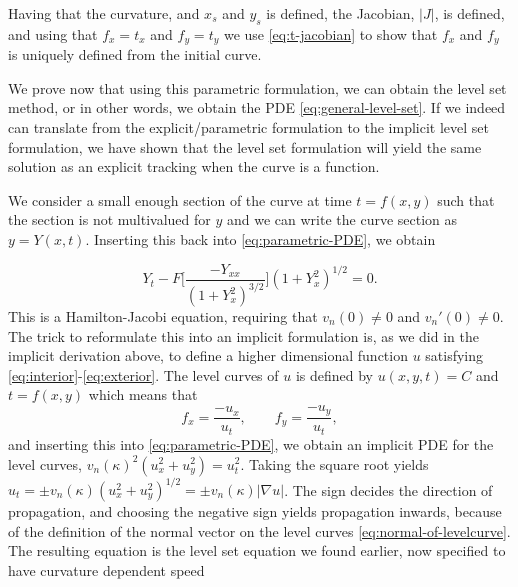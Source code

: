 Having that the curvature, and $x_s$ and $y_s$ is defined, the Jacobian, $|J|$, is defined, and using that $f_x = t_x$ and $f_y=t_y$ we use \eqref{eq:t-jacobian} to show that $f_x$ and $f_y$ is uniquely defined from the initial curve. 

We prove now that using this parametric formulation, we can obtain the level set method, or in other words, we obtain the PDE \eqref{eq:general-level-set}. If we indeed can translate from the explicit/parametric formulation to the implicit level set formulation, we have shown that the level set formulation will yield the same solution as an explicit tracking when the curve is a function.

We consider a small enough section of the curve at time $t=f(x, y)$ such that the section is not multivalued for $y$ and we can write the curve section as $y=Y(x, t)$. Inserting this back into \eqref{eq:parametric-PDE}, we obtain 

\begin{equation}
    Y_t - F\bigg[\frac{-Y_{xx}}{(1+Y_x^2)^{3/2}} \bigg](1+Y_x^2)^{1/2} = 0.
\end{equation}
This is a Hamilton-Jacobi equation, requiring that $v_n(0)\neq 0$ and $v_n'(0)\neq 0$. The trick to reformulate this into an implicit formulation is, as we did in the implicit derivation above, to define a higher dimensional function $u$ satisfying \eqref{eq:interior}-\eqref{eq:exterior}. The level curves of $u$ is defined by $u(x, y, t)=C$ and $t=f(x, y)$ which means that
\begin{equation}
    f_x = \frac{-u_x}{u_t}, \qquad f_y = \frac{-u_y}{u_t},
\end{equation}
and inserting this into \eqref{eq:parametric-PDE}, we obtain an implicit PDE for the level curves, $v_n(\kappa)^2(u_x^2+u_y^2) = u_t^2$. Taking the square root yields $u_t = \pm v_n(\kappa)(u_x^2+u_y^2)^{1/2} = \pm v_n(\kappa)|\nabla u|$. The sign decides the direction of propagation, and choosing the negative sign yields propagation inwards, because of the definition of the normal vector on the level curves \eqref{eq:normal-of-levelcurve}. The resulting equation is the level set equation we found earlier, now specified to have curvature dependent speed

